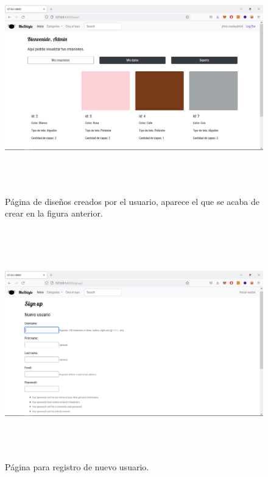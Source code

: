 \documentclass[letterpaper,12pt]{article}
\begin{document}
\begin{figure}[H]
	\includegraphics[width=18cm, height=10cm]{15}
	\centering
	\caption{Página de diseños creados por el usuario, aparece el que se acaba de crear en la figura anterior.}
\end{figure}
\begin{figure}[H]
	\includegraphics[width=18cm, height=10cm]{16}
	\centering
	\caption{Página para registro de nuevo usuario.}
\end{figure}
\end{document}
